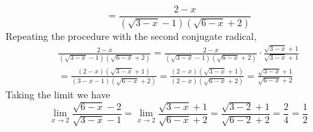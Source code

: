 \documentclass{article}
\begin{document}
\begin{enumerate}
\begin{equation*}
    = \frac{2-x}{(\sqrt{3-x}-1)(\sqrt{6-x}+2)}
  \end{equation*}
  Repeating the procedure with the second conjugate radical,
  \begin{multline*}
    \frac{2-x}{(\sqrt{3-x}-1)(\sqrt{6-x}+2)}
    = \frac{2-x}{(\sqrt{3-x}-1)(\sqrt{6-x}+2)} \cdot 
    \frac{\sqrt{3-x}+1}{\sqrt{3-x}+1}
    \\
    = \frac{(2-x)(\sqrt{3-x}+1)}{(3-x-1)(\sqrt{6-x}+2)}
    = \frac{(2-x)(\sqrt{3-x}+1)}{(2-x)(\sqrt{6-x}+2)}
    = \frac{\sqrt{3-x}+1}{\sqrt{6-x}+2}
  \end{multline*}
  Taking the limit we have
  \begin{equation*}
    \lim_{x\to 2} \frac{\sqrt{6-x}-2}{\sqrt{3-x}-1}
    = \lim_{x\to 2} \frac{\sqrt{3-x}+1}{\sqrt{6-x}+2}
    = \frac{\sqrt{3-2}+1}{\sqrt{6-2}+2} = \frac{2}{4} = \frac{1}{2}
  \end{equation*}
\end{enumerate}
\end{document}
